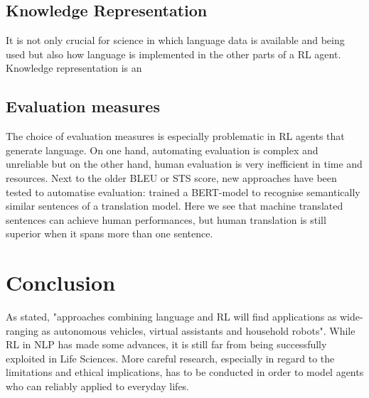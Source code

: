 \documentclass[11pt,a4paper]{article}
\begin{document}
\subsection{Knowledge Representation}
It is not only crucial for science in which language data is available and being used but also how language is implemented in the other parts of a RL agent. Knowledge representation is an 

\subsection{Evaluation measures}
The choice of evaluation measures is especially problematic in RL agents that generate language. On one hand, automating evaluation is complex and unreliable but on the other hand, human evaluation is very inefficient in time and resources. Next to the older BLEU or STS score, new approaches have been tested to automatise evaluation: \citet{yasui-etal-2019} trained a BERT-model to recognise semantically similar sentences of a translation model. Here we see that machine translated sentences can achieve human performances, but human translation is still superior when it spans more than one sentence.


\section{Conclusion}
As  \citet{ijcai2019} stated, "approaches combining language and RL will find applications as wide-ranging as autonomous vehicles, virtual assistants and household robots". While RL in NLP has made some advances, it is still far from being successfully exploited in Life Sciences. More careful research, especially in regard to the limitations and ethical implications, has to be conducted in order to model agents who can reliably applied to everyday lifes. 

\newpage

\end{document}
